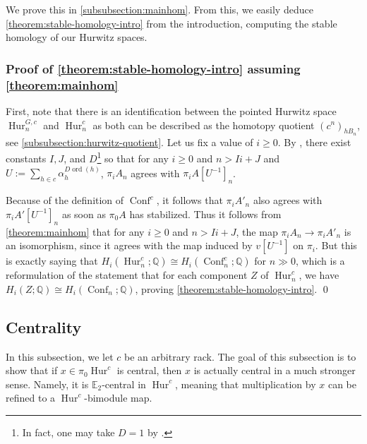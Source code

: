 \documentclass[12 pt]{amsart}
\theoremstyle{plain}
\theoremstyle{definition}
\theoremstyle{remark}
\numberwithin{equation}{section}
\DeclareMathOperator\Hur{Hur}
\DeclareMathOperator\Conf{Conf}
\newcommand\QQ{\mathbb{Q}}
\newcommand\EE{\mathbb{E}}
\DeclareMathOperator\ord{ord}
\begin{document}
We prove this in \autoref{subsubsection:mainhom}.
From this, we easily deduce 
\autoref{theorem:stable-homology-intro}
from the introduction, computing the stable homology of our Hurwitz spaces.
\subsubsection{Proof of \autoref{theorem:stable-homology-intro} assuming
\autoref{theorem:mainhom}}
	\label{subsubsection:proof-stable-homology}

	First, note that there is an identification between the pointed Hurwitz space
	$\Hur_n^{G,c}$ and $\Hur_n^{c}$ as both can be described as the homotopy
	quotient $(c^n)_{hB_n}$, see \autoref{subsubsection:hurwitz-quotient}.
	Let us fix a value of $i\geq0$. 
	By \cite[Theorem 6.1]{EllenbergVW:cohenLenstra},
	there exist constants
	$I,J$, and $D$\footnote{In fact, one may take $D = 1$ by 
\cite[Proposition
A.3.1]{ellenbergL:homological-stability-for-generalized-hurwitz-spaces}.}
	so
	that for any $i \geq 0$ and $n > Ii + J$ and $U := \sum_{h
\in c} \alpha_h^{D\ord(h)}$,
$\pi_iA_n$ agrees with $\pi_iA[U^{-1}]_n$.

	Because of the definition of $\Conf^{c}$, it follows that $\pi_iA'_n$
	also agrees with $\pi_iA'[U^{-1}]_n$ as soon as $\pi_0A$ has stabilized.
	Thus it follows from \autoref{theorem:mainhom} that for any $i \geq 0$ and $n > Ii + J$, the map $\pi_iA_n \to \pi_iA'_n$
	is an isomorphism, since it agrees with the map induced by $v[U^{-1}]$
	on $\pi_i$. But
	this is exactly saying that $H_i(\Hur_n^{c};\QQ) \cong
	H_i(\Conf_n^{c};\QQ)$ for $n\gg0$, which is a reformulation of the
	statement that for each component $Z$ of $\Hur_n^{c}$, we have
$H_i(Z;\QQ) \cong
H_i(\Conf_n;\QQ)$, proving \autoref{theorem:stable-homology-intro}.
\qed

\subsection{Centrality}
\label{subsection:centrality}
In this subsection, we let $c$ be an arbitrary rack. The goal of this subsection is to show that if $x \in \pi_0\Hur^c$ is central, then $x$ is actually central in a much stronger sense. Namely, it is $\EE_2$-central in $\Hur^c$, meaning that multiplication by $x$ can be refined to a $\Hur^c$-bimodule map.
\end{document}

